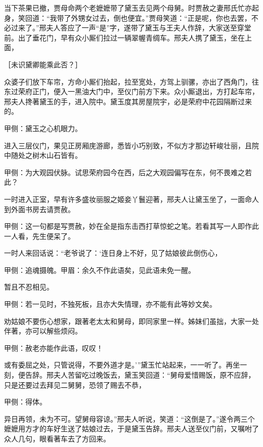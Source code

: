 \begin{parag}
    当下茶果已撤，贾母命两个老嬷嬷带了黛玉去见两个母舅。时贾赦之妻邢氏忙亦起身，笑回道：“我带了外甥女过去，倒也便宜。”贾母笑道：“正是呢，你也去罢，不必过来了。”邢夫人答应了一声“是”字，遂带了黛玉与王夫人作辞，大家送至穿堂前。出了垂花门，早有众小厮们拉过一辆翠幄青绸车。邢夫人携了黛玉，坐在上面，\begin{note}［未识黛卿能乘此否？］\end{note}众婆子们放下车帘，方命小厮们抬起，拉至宽处，方驾上驯骡，亦出了西角门，往东过荣府正门，便入一黑油大门中，至仪门前方下来。众小厮退出，方打起车帘，邢夫人搀著黛玉的手，进入院中。黛玉度其房屋院宇，必是荣府中花园隔断过来的。\begin{note}甲侧：黛玉之心机眼力。\end{note}进入三层仪门，果见正房厢庑游廊，悉皆小巧别致，不似方才那边轩峻壮丽，且院中随处之树木山石皆有。\begin{note}甲侧：为大观园伏脉。试思荣府园今在西，后之大观园偏写在东，何不畏难之若此？\end{note}一时进入正室，早有许多盛妆丽服之姬妾丫鬟迎著，邢夫人让黛玉坐了，一面命人到外面书房去请贾赦。\begin{note}甲侧：这一句都是写贾赦，妙在全是指东击西打草惊蛇之笔。若看其写一人即作此一人看，先生便呆了。\end{note}一时人来回话说：“老爷说了：‘连日身上不好，见了姑娘彼此倒伤心，\begin{note}甲侧：追魂摄魄。甲眉：余久不作此语矣，见此语未免一醒。\end{note}暂且不忍相见。\begin{note}甲侧：若一见时，不独死板，且亦大失情理，亦不能有此等妙文矣。\end{note}劝姑娘不要伤心想家，跟著老太太和舅母，即同家里一样。姊妹们虽拙，大家一处伴著，亦可以解些烦闷。\begin{note}甲侧：赦老亦能作此语，叹叹！\end{note}或有委屈之处，只管说得，不要外道才是。’”黛玉忙站起来，一一听了。再坐一刻，便告辞。邢夫人苦留吃过晚饭去，黛玉笑回道：“舅母爱惜赐饭，原不应辞，只是还要过去拜见二舅舅，恐领了赐去不恭，\begin{note}甲侧：得体。\end{note}异日再领，未为不可。望舅母容谅。”邢夫人听说，笑道：“这倒是了。”遂令两三个嬷嬷用方才的车好生送了姑娘过去，于是黛玉告辞。邢夫人送至仪门前，又嘱咐了众人几句，眼看著车去了方回来。
\end{parag}


